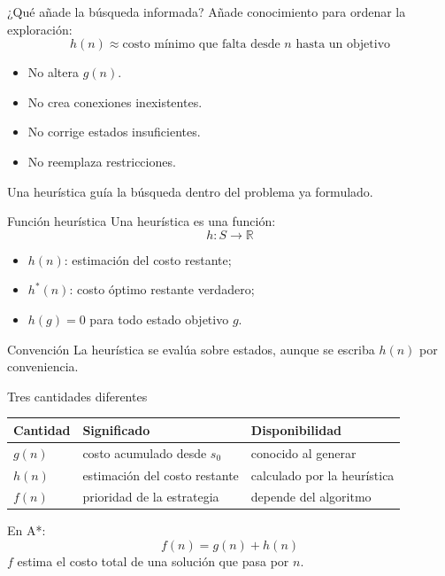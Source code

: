 \documentclass[aspectratio=169,11pt]{beamer}
\begin{document}
\begin{frame}{¿Qué añade la búsqueda informada?}
  Añade conocimiento para ordenar la exploración:
  \[
    h(n)\approx \text{costo mínimo que falta desde }n\text{ hasta un objetivo}
  \]
  \begin{itemize}
    \item No altera $g(n)$.
    \item No crea conexiones inexistentes.
    \item No corrige estados insuficientes.
    \item No reemplaza restricciones.
  \end{itemize}
  \alert{Una heurística guía la búsqueda dentro del problema ya formulado.}
\end{frame}

\begin{frame}{Función heurística}
  Una heurística es una función:
  \[
    h:S\rightarrow\mathbb{R}
  \]
  \begin{itemize}
    \item $h(n)$: estimación del costo restante;
    \item $h^*(n)$: costo óptimo restante verdadero;
    \item $h(g)=0$ para todo estado objetivo $g$.
  \end{itemize}
  \begin{block}{Convención}
    La heurística se evalúa sobre estados, aunque se escriba $h(n)$ por conveniencia.
  \end{block}
\end{frame}

\begin{frame}{Tres cantidades diferentes}
  \small
  \begin{tabularx}{\textwidth}{>{\bfseries}p{}Xp{}}
    \toprule
    Cantidad & Significado & Disponibilidad \\\midrule
    $g(n)$ & costo acumulado desde $s_0$ & conocido al generar \\
    $h(n)$ & estimación del costo restante & calculado por la heurística \\
    $f(n)$ & prioridad de la estrategia & depende del algoritmo \\
    \bottomrule
  \end{tabularx}
  \vfill
  En A*:
  \[
    \boxed{f(n)=g(n)+h(n)}
  \]
  $f$ estima el costo total de una solución que pasa por $n$.
\end{frame}
\end{document}
